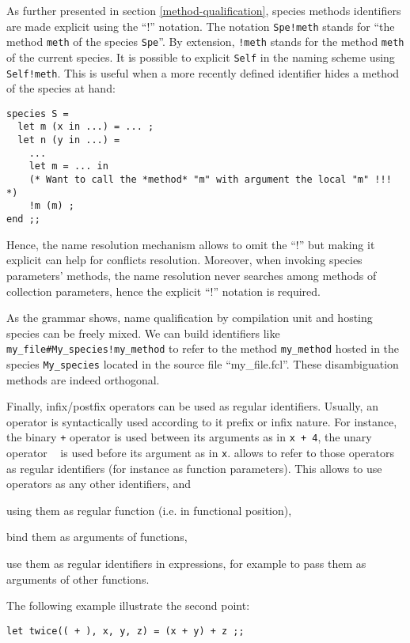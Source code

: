 \medskip {} As further presented in section
\ref{method-qualification}, species methods identifiers are made
explicit using the ``!'' notation. The notation {\tt Spe!meth} stands
for ``the method {\tt meth} of the species {\tt Spe}''. By extension,
{\tt !meth} stands for the method {\tt meth} of the current
species. It is possible to explicit {\tt Self} in the naming scheme
using {\tt Self!meth}. This is useful when a more recently defined
identifier hides a method of the species at hand:

{\scriptsize
\begin{lstlisting}
species S =
  let m (x in ...) = ... ;
  let n (y in ...) =
    ...
    let m = ... in
    (* Want to call the *method* "m" with argument the local "m" !!! *)
    !m (m) ;
end ;;
\end{lstlisting}}

Hence, the name resolution mechanism allows to omit the ``!'' but
making it explicit can help for conflicts resolution. Moreover, when
invoking species parameters' methods, the name resolution never
searches among methods of collection parameters, hence the explicit ``!''
notation is required.

As the grammar shows, name qualification by compilation unit and
hosting species can be freely mixed. We can build identifiers like
{\tt my\_file\#My\_species!my\_method} to refer to the method
{\tt my\_method} hosted in the species {\tt My\_species} located in
the {\focal} source file ``my\_file.fcl''. These disambiguation
methods are indeed orthogonal.



\medskip
{}

Finally, infix/postfix operators can be used as regular
identifiers. Usually, an operator is syntactically used according to
it prefix or infix nature. For instance, the binary {\tt +} operator
is used between its arguments as in {\tt x + 4}, the unary operator {\tt
  \tilde} is used before its argument as in {\tt \tilde x}. {\focal} allows to
refer to those operators as regular identifiers (for instance as function
parameters).
This allows to use operators as any other identifiers, and
\begin{compact-itemize}
  \item using them as regular function (i.e. in functional position),
  \item bind them as arguments of functions,
  \item use them as regular identifiers in expressions, for example to
    pass them as arguments of other functions.
\end{compact-itemize}
The following example illustrate the second point:
\begin{lstlisting}
let twice(( + ), x, y, z) = (x + y) + z ;;
\end{lstlisting}


